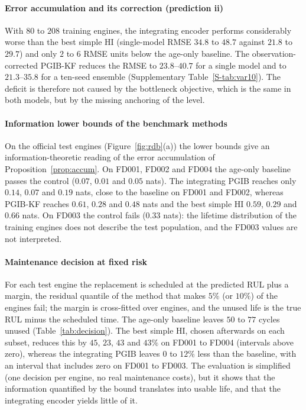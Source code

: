 \documentclass[preprint,12pt]{elsarticle}
\theoremstyle{definition}
\begin{document}
\paragraph{Error accumulation and its correction (prediction ii)} With $80$ to $208$ training engines, the integrating encoder performs considerably worse than the best simple HI (single-model RMSE $34.8$ to $48.7$ against $21.8$ to $29.7$) and only $2$ to $6$ RMSE units below the age-only baseline. The observation-corrected PGIB-KF reduces the RMSE to $23.8$--$40.7$ for a single model and to $21.3$--$35.8$ for a ten-seed ensemble (Supplementary Table~\ref{S-tab:var10}). The deficit is therefore not caused by the bottleneck objective, which is the same in both models, but by the missing anchoring of the level.

\paragraph{Information lower bounds of the benchmark methods} On the official test engines (Figure~\ref{fig:rdb}(a)) the lower bounds give an information-theoretic reading of the error accumulation of Proposition~\ref{prop:accum}. On FD001, FD002 and FD004 the age-only baseline passes the control ($0.07$, $0.01$ and $0.05$ nats). The integrating PGIB reaches only $0.14$, $0.07$ and $0.19$ nats, close to the baseline on FD001 and FD002, whereas PGIB-KF reaches $0.61$, $0.28$ and $0.48$ nats and the best simple HI $0.59$, $0.29$ and $0.66$ nats. On FD003 the control fails ($0.33$ nats): the lifetime distribution of the training engines does not describe the test population, and the FD003 values are not interpreted.

\paragraph{Maintenance decision at fixed risk} For each test engine the replacement is scheduled at the predicted RUL plus a margin, the residual quantile of the method that makes $5\%$ (or $10\%$) of the engines fail; the margin is cross-fitted over engines, and the unused life is the true RUL minus the scheduled time. The age-only baseline leaves $50$ to $77$ cycles unused (Table~\ref{tab:decision}). The best simple HI, chosen afterwards on each subset, reduces this by $45$, $23$, $43$ and $43\%$ on FD001 to FD004 (intervals above zero), whereas the integrating PGIB leaves $0$ to $12\%$ less than the baseline, with an interval that includes zero on FD001 to FD003. The evaluation is simplified (one decision per engine, no real maintenance costs), but it shows that the information quantified by the bound translates into usable life, and that the integrating encoder yields little of it.
\end{document}
